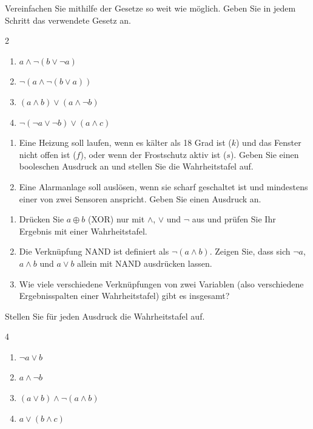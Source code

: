 Vereinfachen Sie mithilfe der Gesetze so weit wie möglich. Geben Sie in jedem Schritt das verwendete Gesetz an.
\begin{multicols}{2}
\begin{enumerate}[label=\alph*)]
\item $a \wedge \neg(b \vee \neg a)$
\item $\neg(a \wedge \neg(b \vee a))$
\item $(a \wedge b) \vee (a \wedge \neg b)$
\item $\neg(\neg a \vee \neg b) \vee (a \wedge c)$
\end{enumerate}
\end{multicols}

\begin{enumerate}[label=\alph*)]
\item Eine Heizung soll laufen, wenn es kälter als 18 Grad ist ($k$) und das Fenster nicht offen ist ($f$), oder wenn der Frostschutz aktiv ist ($s$). Geben Sie einen booleschen Ausdruck an und stellen Sie die Wahrheitstafel auf.
\item Eine Alarmanlage soll auslösen, wenn sie scharf geschaltet ist und mindestens einer von zwei Sensoren anspricht. Geben Sie einen Ausdruck an.
\end{enumerate}

\begin{enumerate}[label=\alph*)]
\item Drücken Sie $a \oplus b$ (XOR) nur mit $\wedge$, $\vee$ und $\neg$ aus und prüfen Sie Ihr Ergebnis mit einer Wahrheitstafel.
\item Die Verknüpfung NAND ist definiert als $\neg(a \wedge b)$. Zeigen Sie, dass sich $\neg a$, $a \wedge b$ und $a \vee b$ allein mit NAND ausdrücken lassen.
\item Wie viele verschiedene Verknüpfungen von zwei Variablen (also verschiedene Ergebnisspalten einer Wahrheitstafel) gibt es insgesamt?
\end{enumerate}

\ueben
{}
Stellen Sie für jeden Ausdruck die Wahrheitstafel auf.
\begin{multicols}{4}
\begin{enumerate}[label=\alph*)]
\item $\neg a \vee b$
\item $a \wedge \neg b$
\item $(a \vee b) \wedge \neg(a \wedge b)$
\item $a \vee (b \wedge c)$
\end{enumerate}
\end{multicols}


